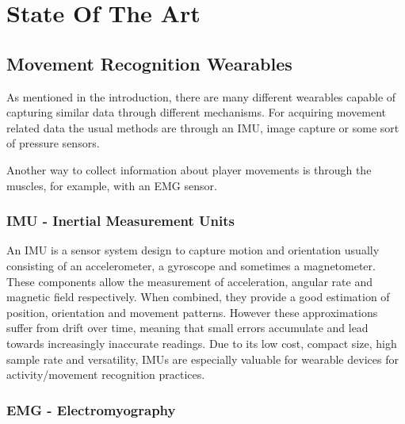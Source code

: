 
%

\chapter{State Of The Art}
\label{cha:soa}

\glsresetall


\newpage

\section{Movement Recognition Wearables}
\label{sec:movement_recognition_wearablesT}

As mentioned in the introduction, there are many different wearables capable of capturing similar data through different mechanisms. %
For acquiring movement related data the usual methods are through an \gls{IMU}, image capture or some sort of pressure sensors.

Another way to collect information about player movements is through the muscles, for example, with an \gls{EMG} sensor.


\subsection{IMU - Inertial Measurement Units}
\label{ssec:imu_STA}

An \gls{IMU} is a sensor system design to capture motion and orientation usually consisting of an accelerometer, a gyroscope and sometimes a magnetometer. These components allow the measurement of acceleration, angular rate and 
magnetic field respectively. When combined, they provide a good estimation of position, orientation and movement patterns. However these approximations suffer from drift over time, meaning that small errors accumulate 
and lead towards increasingly inaccurate readings. Due to its low cost, compact size, high sample rate and versatility, \gls{IMU}s are especially valuable for wearable devices for activity/movement recognition practices.

\subsection{EMG - Electromyography}
\label{ssec:emg_STA}

